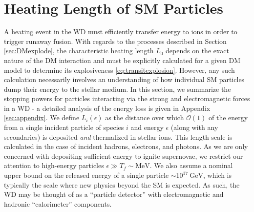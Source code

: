 \documentclass[twocolumn,showpacs,preprintnumbers,amsmath,amssymb,prd]{revtex4}
\newcommand{\OO}{\mathcal{O}}
\newcommand{\GeV}{\text{GeV}}
\begin{document}
\section{Heating Length of SM Particles}
\label{sec:HeatingLength}
A heating event in the WD must efficiently transfer energy to ions in order to trigger runaway fusion.
With regards to the processes described in Section \ref{sec:DMexplode}, the characteristic heating length $L_0$ depends on the exact nature of the DM interaction and must be explicitly calculated for a given DM model to determine its explosiveness \eqref{eq:transitexplosion}.
However, any such calculation necessarily involves an understanding of how individual SM particles dump their energy to the stellar medium.
In this section, we summarize the stopping powers for particles interacting via the strong and electromagnetic forces in a WD - a detailed analysis of the energy loss is given in Appendix \ref{sec:appendix}.
We define $L_i(\epsilon)$ as the distance over which $\OO(1)$ of the energy from a single incident particle of species $i$ and energy $\epsilon$ (along with any secondaries) is deposited \emph{and} thermalized in stellar ions.
This length scale is calculated in the case of incident hadrons, electrons, and photons.
As we are only concerned with depositing sufficient energy to ignite supernovae, we restrict our attention to high-energy particles $\epsilon \gg T_f \sim \text{MeV}$.
We also assume a nominal upper bound on the released energy of a single particle $\sim 10^{17} ~\GeV$, which is typically the scale where new physics beyond the SM is expected.
As such, the WD may be thought of as a ``particle detector'' with electromagnetic and hadronic ``calorimeter'' components. 
\end{document}
